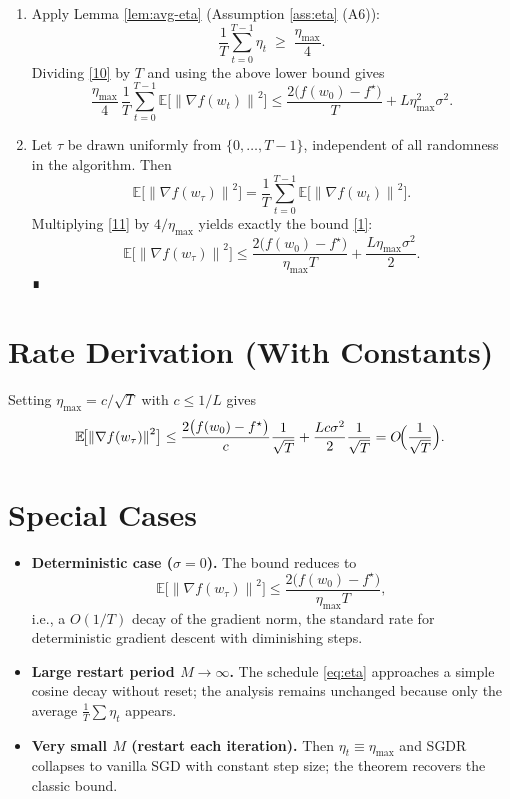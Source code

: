 \documentclass{article}
\newcommand{\EE}{\mathbb{E}}
\newcommand{\norm}[1]{\left\|#1\right\|}
\begin{document}
\begin{enumerate}
\item[Step 9.] %
Apply Lemma \ref{lem:avg-eta} (Assumption \ref{ass:eta} (A6)):
\[
\frac{1}{T}\sum_{t=0}^{T-1}\eta_t\;\ge\;\frac{\eta_{\max}}{4}.
\]
Dividing \eqref{10} by $T$ and using the above lower bound gives
\[
\frac{\eta_{\max}}{4}\,
\frac{1}{T}\sum_{t=0}^{T-1}\EE\!\bigl[\norm{\nabla f(w_t)}^{2}\bigr]
\le
\frac{2\bigl(f(w_0)-f^{\star}\bigr)}{T}
+L\eta_{\max}^{2}\sigma^{2}.
\tag{11}
\]

\item[Step 10.] %
Let $\tau$ be drawn uniformly from $\{0,\dots,T-1\}$, independent of all randomness in the algorithm. Then
\[
\EE\!\bigl[\norm{\nabla f(w_{\tau})}^{2}\bigr]
= \frac{1}{T}\sum_{t=0}^{T-1}\EE\!\bigl[\norm{\nabla f(w_t)}^{2}\bigr].
\]
Multiplying \eqref{11} by $4/\eta_{\max}$ yields exactly the bound \eqref{1}:
\[
\EE\!\bigl[\norm{\nabla f(w_{\tau})}^{2}\bigr]
\le
\frac{2\bigl(f(w_{0})-f^{\star}\bigr)}{\eta_{\max}T}
+\frac{L\eta_{\max}\sigma^{2}}{2}.
\tag{12}
\]
∎
\end{enumerate}

\section*{Rate Derivation (With Constants)}
Setting $\eta_{\max}=c/\sqrt{T}$ with $c\le 1/L$ gives
\[
\EE\!\bigl[\norm{\nabla f(w_{\tau})}^{2}\bigr]
\le \frac{2\bigl(f(w_{0})-f^{\star}\bigr)}{c}\frac{1}{\sqrt{T}}
+\frac{Lc\sigma^{2}}{2}\frac{1}{\sqrt{T}}
=O\!\Bigl(\frac{1}{\sqrt{T}}\Bigr).
\]

\section*{Special Cases}
\begin{itemize}[leftmargin=*]
\item \textbf{Deterministic case ($\sigma=0$).} The bound reduces to
\[
\EE\!\bigl[\norm{\nabla f(w_{\tau})}^{2}\bigr]\le
\frac{2\bigl(f(w_0)-f^{\star}\bigr)}{\eta_{\max}T},
\]
i.e., a $O(1/T)$ decay of the gradient norm, the standard rate for deterministic gradient descent with diminishing steps.
\item \textbf{Large restart period $M\to\infty$.} The schedule \eqref{eq:eta} approaches a simple cosine decay without reset; the analysis remains unchanged because only the average $\frac{1}{T}\sum\eta_t$ appears.
\item \textbf{Very small $M$ (restart each iteration).} Then $\eta_t\equiv\eta_{\max}$ and SGDR collapses to vanilla SGD with constant step size; the theorem recovers the classic bound.
\end{itemize}
\end{document}
